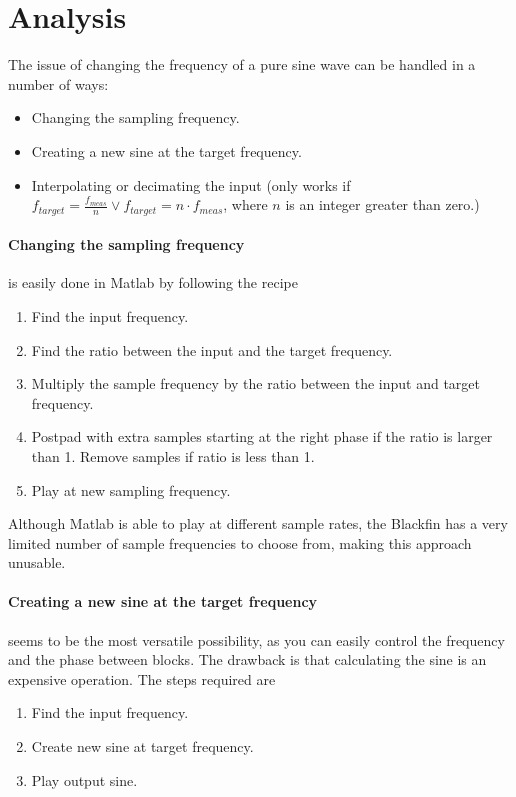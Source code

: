 
\section{Analysis}
The issue of changing the frequency of a pure sine wave can be handled in a number of ways:
\begin{itemize}
	\item Changing the sampling frequency.
	\item Creating a new sine at the target frequency.
	\item Interpolating or decimating the input (only works if $f_{target}=\frac{f_{meas}}{n}\vee f_{target} =n\cdot f_{meas}$, where $n$ is an integer greater than zero.)
\end{itemize}

\paragraph{Changing the sampling frequency} is easily done in Matlab by following the recipe
\begin{enumerate}
	\item Find the input frequency.
	\item Find the ratio between the input and the target frequency.
	\item Multiply the sample frequency by the ratio between the input and target frequency.
	\item Postpad with extra samples starting at the right phase if the ratio is larger than 1. Remove samples if ratio is less than 1.
	\item Play at new sampling frequency.
\end{enumerate}
Although Matlab is able to play at different sample rates, the Blackfin has a very limited number of sample frequencies to choose from, making this approach unusable.

\paragraph{Creating a new sine at the target frequency} seems to be the most versatile possibility, as you can easily control the frequency and the phase between blocks. The drawback is that calculating the sine is an expensive operation. The steps required are
\begin{enumerate}
	\item Find the input frequency.
	\item Create new sine at target frequency.
	\item Play output sine.
\end{enumerate}

